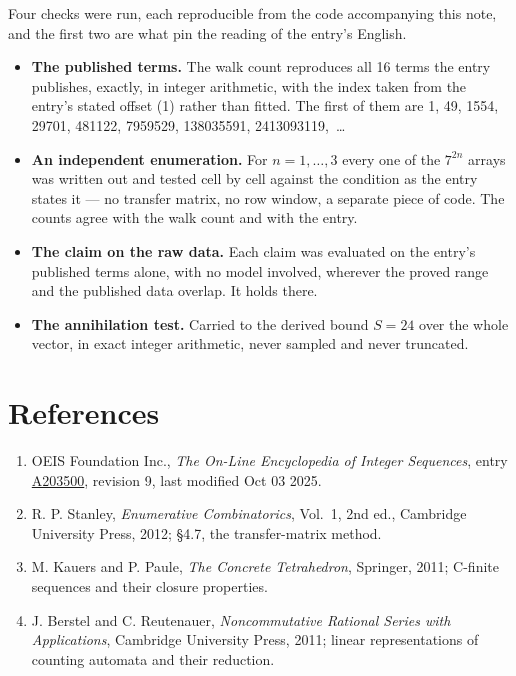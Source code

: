 \documentclass[11pt]{article}
\theoremstyle{definition}
\begin{document}
Four checks were run, each reproducible from the code accompanying this note, and the first two are what pin the reading of the entry's English.

\begin{itemize}

\item {\bfseries The published terms.} The walk count reproduces all 16 terms the entry publishes, exactly, in integer arithmetic, with the index taken from the entry's stated offset (1) rather than fitted. The first of them are 1, 49, 1554, 29701, 481122, 7959529, 138035591, 2413093119,~\dots

\item {\bfseries An independent enumeration.} For $n = 1,\dots,3$ every one of the $7^{2n}$ arrays was written out and tested cell by cell against the condition as the entry states it --- no transfer matrix, no row window, a separate piece of code. The counts agree with the walk count and with the entry.

\item {\bfseries The claim on the raw data.} Each claim was evaluated on the entry's published terms alone, with no model involved, wherever the proved range and the published data overlap. It holds there.

\item {\bfseries The annihilation test.} Carried to the derived bound $S = 24$ over the whole vector, in exact integer arithmetic, never sampled and never truncated.

\end{itemize}

\section{References}

\begin{enumerate}

\item OEIS Foundation Inc., \emph{The On-Line Encyclopedia of Integer Sequences}, entry \href{https://oeis.org/A203500}{A203500}, revision 9, last modified Oct 03 2025.

\item R. P. Stanley, \emph{Enumerative Combinatorics}, Vol.~1, 2nd ed., Cambridge University Press, 2012; \S4.7, the transfer-matrix method.

\item M. Kauers and P. Paule, \emph{The Concrete Tetrahedron}, Springer, 2011; C-finite sequences and their closure properties.

\item J. Berstel and C. Reutenauer, \emph{Noncommutative Rational Series with Applications}, Cambridge University Press, 2011; linear representations of counting automata and their reduction.

\end{enumerate}
\end{document}

